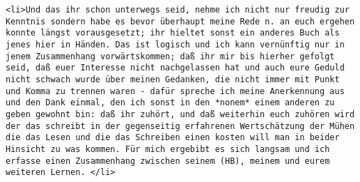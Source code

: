 \documentclass[
]{article}
\begin{document}
\begin{verbatim}
<li>Und das ihr schon unterwegs seid, nehme ich nicht nur freudig zur Kenntnis sondern habe es bevor überhaupt meine Rede n. an euch ergehen konnte längst vorausgesetzt; ihr hieltet sonst ein anderes Buch als jenes hier in Händen. Das ist logisch und ich kann vernünftig nur in jenem Zusammenhang vorwärtskommen; daß ihr mir bis hierher gefolgt seid, daß euer Interesse nicht nachgelassen hat und auch eure Geduld nicht schwach wurde über meinen Gedanken, die nicht immer mit Punkt und Komma zu trennen waren - dafür spreche ich meine Anerkennung aus und den Dank einmal, den ich sonst in den *nonem* einem anderen zu geben gewohnt bin: daß ihr zuhört, und daß weiterhin euch zuhören wird der das schreibt in der gegenseitig erfahrenen Wertschätzung der Mühen die das Lesen und die das Schreiben einen kosten will man in beider Hinsicht zu was kommen. Für mich ergebibt es sich langsam und ich erfasse einen Zusammenhang zwischen seinem (HB), meinem und eurem weiteren Lernen. </li>
\end{verbatim}
\end{document}
